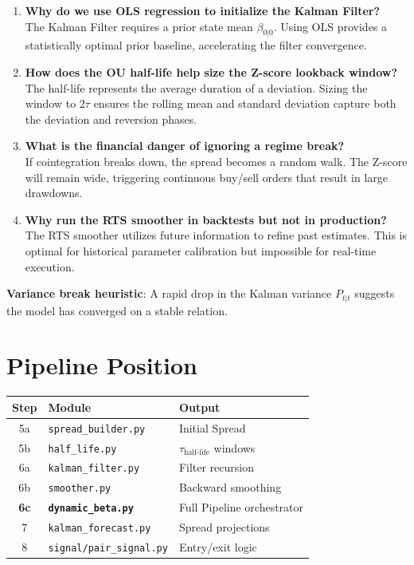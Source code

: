 \documentclass[10pt,a4paper,twocolumn]{article}
\newcommand{\tauhl}{\tau_{\text{half-life}}}
\begin{document}
\begin{tcolorbox}[exbox={Key Pipeline Orchestration Questions}]
\begin{enumerate}\setlength\itemsep{1pt}
  \item \textbf{Why do we use OLS regression to initialize the Kalman Filter?}\\
    The Kalman Filter requires a prior state mean $\beta_{0|0}$. Using OLS provides a statistically optimal prior baseline, accelerating the filter convergence.
  \item \textbf{How does the OU half-life help size the Z-score lookback window?}\\
    The half-life represents the average duration of a deviation. Sizing the window to $2\tau$ ensures the rolling mean and standard deviation capture both the deviation and reversion phases.
  \item \textbf{What is the financial danger of ignoring a regime break?}\\
    If cointegration breaks down, the spread becomes a random walk. The Z-score will remain wide, triggering continuous buy/sell orders that result in large drawdowns.
  \item \textbf{Why run the RTS smoother in backtests but not in production?}\\
    The RTS smoother utilizes future information to refine past estimates. This is optimal for historical parameter calibration but impossible for real-time execution.
\end{enumerate}
\tcblower
\textbf{Variance break heuristic}: A rapid drop in the Kalman variance $P_{t|t}$ suggests the model has converged on a stable relation.
\end{tcolorbox}

\section{Pipeline Position}

\begin{center}{\small
\begin{tabular}{@{}clp{2.5cm}@{}}
\toprule Step & Module & Output\\\midrule
5a & \texttt{spread\_builder.py} & Initial Spread\\
5b & \texttt{half\_life.py} & $\tauhl$ windows\\
6a & \texttt{kalman\_filter.py} & Filter recursion\\
6b & \texttt{smoother.py} & Backward smoothing\\
\textbf{6c} & \textbf{\texttt{dynamic\_beta.py}} & Full Pipeline orchestrator\\
7 & \texttt{kalman\_forecast.py} & Spread projections\\
8 & \texttt{signal/pair\_signal.py} & Entry/exit logic\\
\bottomrule
\end{tabular}
}\end{center}
\end{document}
